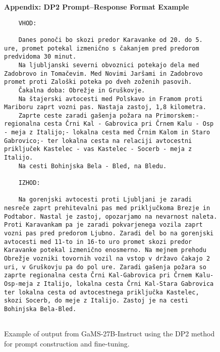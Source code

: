 \begin{figure*}[t]
    \centering
    \caption*{\textbf{Appendix: DP2 Prompt–Response Format Example}}

    \begin{verbatim}
    VHOD:

    Danes ponoči bo skozi predor Karavanke od 20. do 5. ure, promet potekal izmenično s čakanjem pred predorom predvidoma 30 minut.
    Na ljubljanski severni obvoznici potekajo dela med Zadobrovo in Tomačevim. Med Novimi Jaršami in Zadobrovo promet proti Zaloški poteka po dveh zoženih pasovih.
    Čakalna doba: Obrežje in Gruškovje.
    Na štajerski avtocesti med Polskavo in Framom proti Mariboru zaprt vozni pas. Nastaja zastoj, 1,8 kilometra.
    Zaprte ceste zaradi gašenja požara na Primorskem:- regionalna cesta Črni Kal - Gabrovica pri Črnem Kalu - Osp - meja z Italijo;- lokalna cesta med Črnim Kalom in Staro Gabrovico;- ter lokalna cesta na relaciji avtocestni priključek Kastelec - vas Kastelec - Socerb - meja z Italijo.
    Na cesti Bohinjska Bela - Bled, na Bledu.
    
    IZHOD:
    
    Na gorenjski avtocesti proti Ljubljani je zaradi nesreče zaprt prehitevalni pas med priključkoma Brezje in Podtabor. Nastal je zastoj, opozarjamo na nevarnost naleta. Proti Karavankam pa je zaradi pokvarjenega vozila zaprt vozni pas pred predorom Ljubno. Zaradi del bo na gorenjski avtocesti med 11-to in 16-to uro promet skozi predor Karavanke potekal izmenično enosmerno. Na mejnem prehodu Obrežje vozniki tovornih vozil na vstop v državo čakajo 2 uri, v Gruškovju pa do pol ure. Zaradi gašenja požara so zaprte regionalna cesta Črni Kal-Gabrovica pri Črnem Kalu-Osp-meja z Italijo, lokalna cesta Črni Kal-Stara Gabrovica ter lokalna cesta od avtocestnega priključka Kastelec, skozi Socerb, do meje z Italijo. Zastoj je na cesti Bohinjska Bela-Bled.


    \end{verbatim}

    \caption{Example of output from GaMS-27B-Instruct using the DP2 method for prompt construction and fine-tuning.}
    \label{fig:result_dp2}
\end{figure*}

